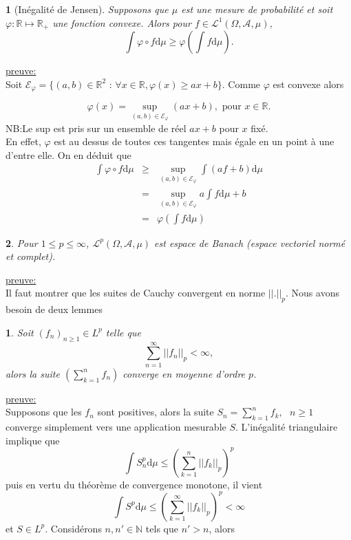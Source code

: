 \documentclass[8pt,notheorems]{beamer}
\def \N{\mathbb N}
\def \R{\mathbb{R}}
\newtheorem{theorem}{\translate{Theorem}}[section]
\newtheorem{theorem}{\translate{Theoreme}}
\newtheorem{lemma}{\translate{Lemme}}
\theoremstyle{definition}
\theoremstyle{example}
\theoremstyle{mystyle}
\theoremstyle{plain}
\begin{document}
\begin{frame}[allowframebreaks]

\begin{theorem}[Inégalité de Jensen]
Supposons que $\mu$ est une mesure de probabilité et soit $\varphi:\R\mapsto \R_+$ une fonction convexe. Alors pour $f\in\mathcal{L}^1(\Omega,\mathcal{A},\mu)$,
$$
\int\varphi\circ f\text{d}\mu \geq \varphi\left(\int f\text{d}\mu\right).
$$
\end{theorem}
\underline{preuve:}\\
Soit 
$\mathcal{E}_{\varphi} = \{(a,b)\in\mathbb{R}^2\text{ : }\forall x\in\R,\varphi(x)\geq ax+b\}$. Comme $\varphi$ est convexe alors 

$$
\varphi(x) = \underset{(a,b)\in \mathcal{E}_{\varphi}}{\sup}(a x+b),\text{ pour }x\in \R.
$$
NB:Le sup est pris sur un ensemble de réel $ax+b$ pour $x$ fixé.\\
En effet, $\varphi$ est au dessus de toutes ces tangentes mais égale en un point à une d'entre elle. On en déduit que 
\begin{eqnarray*}
\int\varphi\circ f\text{d}\mu&\geq&\underset{(a,b)\in \mathcal{E}_{\varphi}}{\sup} \int(af+b)\text{d}\mu\\
&=&\underset{(a,b)\in \mathcal{E}_{\varphi}}{\sup} a\int f\text{d}\mu + b\\
&=&\varphi\left( \int f\text{d}\mu\right)
\end{eqnarray*}
\begin{theorem}
Pour $1\leq p\leq \infty$, $\mathcal{L}^p(\Omega, \mathcal{A},\mu)$  est espace de Banach (espace vectoriel normé et complet).
\end{theorem}
\underline{preuve:}\\
Il faut montrer que les suites de Cauchy convergent en norme $||.||_p$. Nous avons besoin de deux lemmes 
\begin{lemma}
Soit $(f_n)_{n\geq1}\in L^p$ telle que 
$$
\sum_{n=1}^\infty ||f_n||_p<\infty,
$$
alors la suite $(\sum_{k=1}^n f_n)$ converge en moyenne d'ordre $p$.
\end{lemma}
\underline{preuve:}\\
Supposons que les $f_n$ sont positives, alors la suite $S_n = \sum_{k=1}^n f_k,\text{ } n\geq1$ converge simplement vers une application mesurable $S$. L'inégalité triangulaire implique que 
$$
\int S_n^p\text{d}\mu\leq \left(\sum_{k=1}^n ||f_k||_p\right)^p
$$
puis en vertu du théorème de convergence monotone, il vient 
$$
\int S^p \text{d}\mu\leq \left(\sum_{k=1}^\infty ||f_k||_p\right)^p<\infty
$$
et $S\in L^p$. Considérons $n,n'\in\N$ tels que $n'>n$, alors 

\end{frame}
\end{document}
